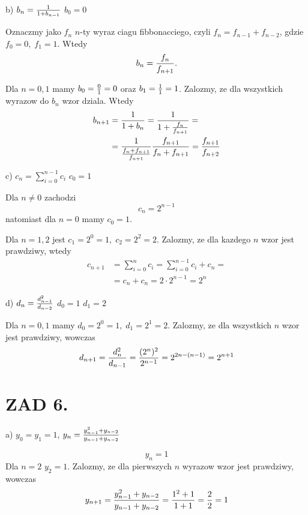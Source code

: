 \documentclass{article}[13pt]
\begin{document}
    \medskip

    b) $b_n={1\over 1+b_{n-1}}$ $b_0=0$
    \medskip

    Oznaczmy jako $f_n$ $n$-ty wyraz ciagu fibbonacciego, czyli $f_n=f_{n-1}+f_{n-2}$, gdzie $f_0=0,\;f_1=1$. Wtedy 
    $$b_n={f_n\over f_{n+1}}.$$

    Dla $n=0, 1$ mamy $b_0={0\over1}=0$ oraz $b_1={1\over1}=1$. Zalozmy, ze dla wszystkich wyrazow do $b_n$ wzor dziala. Wtedy
    \begin{align*}
        b_{n+1}&={1\over 1+b_{n}}={1\over 1+{f_{n}\over f_{n+1}}}=\\
        &={1\over {f_n+f_{n+1}\over f_{n+1}}}{f_{n+1}\over f_n+f_{n+1}}={f_{n+1}\over f_{n+2}}
    \end{align*}

    \medskip

    c) $c_n=\sum\limits_{i=0}^{n-1}c_i$ $c_0=1$

    Dla $n\neq 0$ zachodzi
    $$c_n=2^{n-1}$$
    natomiast dla $n=0$ mamy $c_0=1$.
    \medskip

    Dla $n=1,2$ jest $c_1=2^0=1,\;c_2=2^2=2$. Zalozmy, ze dla kazdego $n$ wzor jest prawdziwy, wtedy
    \begin{align*}
        c_{n+1}&=\sum\limits_{i=0}^nc_i=\sum\limits_{i=0}^{n-1}c_i+c_n=\\
        &=c_n+c_n=2\cdot 2^{n-1}=2^n
    \end{align*}

    \medskip

    d) $d_n={d_{n-1}^2\over d_{n-2}}$ $d_0=1$ $d_1=2$
    \medskip

    Dla $n=0,1$ mamy $d_0=2^0=1,\;d_1=2^1=2$. Zalozmy, ze dla wszystkich $n$ wzor jest prawdziwy, wowczas
    \begin{align*}
        d_{n+1}={d_n^2\over d_{n-1}}={(2^n)^2\over 2^{n-1}}=2^{2n-(n-1)}=2^{n+1}
    \end{align*}


    \section*{ZAD 6.}

    a) $y_0=y_1=1$, $y_n={y_{n-1}^2+y_{n-2}\over y_{n-1}+y_{n-2}}$

    $$y_n=1$$
    Dla $n=2$ $y_2=1$. Zalozmy, ze dla pierwszych $n$ wyrazow wzor jest prawdziwy, wowczas
    \begin{align*}
        y_{n+1}={y_{n-1}^2+y_{n-2}\over y_{n-1}+y_{n-2}}={1^2+1\over 1+1}=\frac 22=1
    \end{align*}
\end{document}
